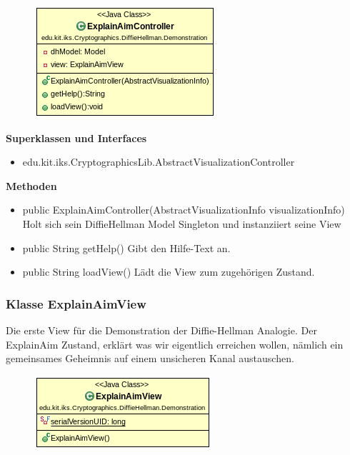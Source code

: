 \documentclass{article}
\begin{document}
      \begin{figure}[H]
        \centering
        \includegraphics{resources/edu-kit-iks-Cryptographics-DiffieHellman-Demonstration-ExplainAimController}
      \end{figure}

      \textbf{Superklassen und Interfaces}
      \begin{itemize}
        \item edu.kit.iks.CryptographicsLib.AbstractVisualizationController
      \end{itemize}

      \textbf{Methoden}
      \begin{itemize}
          \item public ExplainAimController(AbstractVisualizationInfo visualizationInfo) \newline
              Holt sich sein DiffieHellman Model Singleton und instanziiert seine View
        \item public String getHelp() \newline
        Gibt den Hilfe-Text an.
        \item public String loadView() \newline
        Lädt die View zum zugehörigen Zustand.
      \end{itemize}

\subsubsection{Klasse ExplainAimView}
      Die erste View für die Demonstration der Diffie-Hellman Analogie.
      Der ExplainAim Zustand, erklärt was wir eigentlich erreichen wollen,
      nämlich ein gemeinsames Geheimnis auf einem unsicheren Kanal austauschen.

      \begin{figure}[H]
        \centering
        \includegraphics{resources/edu-kit-iks-Cryptographics-DiffieHellman-Demonstration-ExplainAimView}
      \end{figure}
\end{document}
